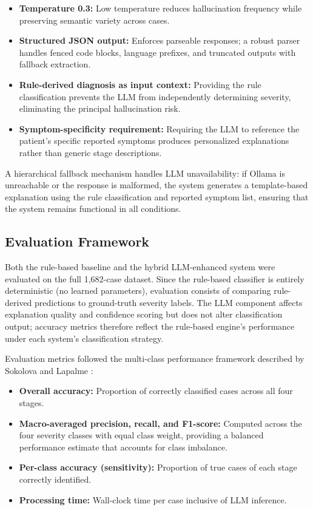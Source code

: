 \documentclass[12pt,a4paper]{article}
\begin{document}
\begin{itemize}
  \item \textbf{Temperature 0.3:} Low temperature reduces hallucination frequency while preserving semantic variety across cases.
  \item \textbf{Structured JSON output:} Enforces parseable responses; a robust parser handles fenced code blocks, language prefixes, and truncated outputs with fallback extraction.
  \item \textbf{Rule-derived diagnosis as input context:} Providing the rule classification prevents the LLM from independently determining severity, eliminating the principal hallucination risk.
  \item \textbf{Symptom-specificity requirement:} Requiring the LLM to reference the patient's specific reported symptoms produces personalized explanations rather than generic stage descriptions.
\end{itemize}

A hierarchical fallback mechanism handles LLM unavailability: if Ollama is unreachable or the response is malformed, the system generates a template-based explanation using the rule classification and reported symptom list, ensuring that the system remains functional in all conditions.

\subsection{Evaluation Framework}

Both the rule-based baseline and the hybrid LLM-enhanced system were evaluated on the full 1,682-case dataset. Since the rule-based classifier is entirely deterministic (no learned parameters), evaluation consists of comparing rule-derived predictions to ground-truth severity labels. The LLM component affects explanation quality and confidence scoring but does not alter classification output; accuracy metrics therefore reflect the rule-based engine's performance under each system's classification strategy.

Evaluation metrics followed the multi-class performance framework described by Sokolova and Lapalme \cite{ref26}:

\begin{itemize}
  \item \textbf{Overall accuracy:} Proportion of correctly classified cases across all four stages.
  \item \textbf{Macro-averaged precision, recall, and F1-score:} Computed across the four severity classes with equal class weight, providing a balanced performance estimate that accounts for class imbalance.
  \item \textbf{Per-class accuracy (sensitivity):} Proportion of true cases of each stage correctly identified.
  \item \textbf{Processing time:} Wall-clock time per case inclusive of LLM inference.
\end{itemize}
\end{document}
